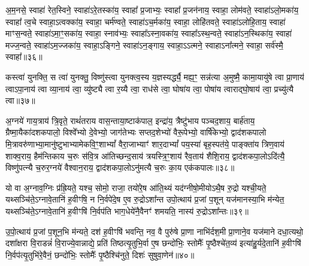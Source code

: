 अ॒म॒नसे॒ स्वाहा॑ रेत॒स्विने॒ स्वाहा॑\-ऽरे॒तस्का॑य॒ स्वाहा᳚ प्र॒जाभ्यः॒ स्वाहा᳚ प्र॒जन॑नाय॒ स्वाहा॒ लोम॑वते॒ स्वाहा॑\-ऽलो॒मका॑य॒ स्वाहा᳚ त्व॒चे स्वाहा॒\-ऽत्वक्का॑य॒ स्वाहा॒ चर्म॑ण्वते॒ स्वाहा॑\-ऽच॒र्मका॑य॒ स्वाहा॒ लोहि॑तवते॒ स्वाहा॑\-ऽलोहि॒ताय॒ स्वाहा॑ माꣳस॒न्वते॒ स्वाहा॑\-ऽमा॒ꣳ॒सका॑य॒ स्वाहा॒ स्नाव॑भ्यः॒ स्वाहा᳚\-ऽस्ना॒वका॑य॒ स्वाहा᳚\-ऽस्थ॒न्वते॒ स्वाहा॑\-ऽन॒स्थिका॑य॒ स्वाहा॑ मज्ज॒न्वते॒ स्वाहा॑\-ऽम॒ज्जका॑य॒ स्वाहा॒\-ऽङ्गिने॒ स्वाहा॑\-ऽन॒ङ्गाय॒ स्वाहा॒\-ऽ\-ऽत्मने॒ स्वाहा\-ऽना᳚त्मने॒ स्वाहा॒ सर्व॑स्मै॒ स्वाहा᳚॥३६॥

{\anuvakamend[{म॒न॒स्विने॒ स्वाहा\-ऽना᳚त्मने॒ स्वाहा॒ द्वे च॑॥12॥}]}

कस्त्वा॑ युनक्ति॒ स त्वा॑ युनक्तु॒ विष्णु॑स्त्वा युनक्त्व॒स्य य॒ज्ञस्यर्द्ध्यै॒ मह्य॒ꣳ॒ सन्न॑त्या अ॒मुष्मै॒ कामा॒यायु॑षे त्वा प्रा॒णाय॑ त्वा\-ऽपा॒नाय॑ त्वा व्या॒नाय॑ त्वा॒ व्यु॑ष्ट्यै त्वा र॒य्यै त्वा॒ राध॑से त्वा॒ घोषा॑य त्वा॒ पोषा॑य त्वाराद्घो॒षाय॑ त्वा॒ प्रच्यु॑त्यै त्वा॥३७॥

{\anuvakamend[{कस्त्वा॒\-ऽष्टात्रिꣳ॑शत्॥13॥}]}

अ॒ग्नये॑ गाय॒त्राय॑ त्रि॒वृते॒ राथं॑तराय वास॒न्ताया॒ष्टाक॑पाल॒ इन्द्रा॑य॒ त्रैष्टु॑भाय पञ्चद॒शाय॒ बार्\mbox{}ह॑ताय॒ ग्रैष्मा॒यैका॑दशकपालो॒ विश्वे᳚भ्यो दे॒वेभ्यो॒ जाग॑तेभ्यः सप्तद॒शेभ्यो॑ वैरू॒पेभ्यो॒ वार्\mbox{}षि॑केभ्यो॒ द्वाद॑शकपालो मि॒त्रावरु॑णाभ्या॒मानु॑ष्टुभाभ्यामेक\-वि॒ꣳ॒शा\-भ्यां᳚ वैरा॒जाभ्याꣳ॑ शार॒दा\-भ्यां᳚ पय॒स्या॑ बृह॒स्पत॑ये॒ पाङ्क्ता॑य त्रिण॒वाय॑ शाक्व॒राय॒ हैम॑न्तिकाय च॒रुः स॑वि॒त्र आ॑तिच्छन्द॒साय॑ त्रयस्त्रि॒ꣳ॒शाय॑ रैव॒ताय॑ शैशि॒राय॒ द्वाद॑शकपा॒लो\-ऽदि॑त्यै॒ विष्णु॑पत्न्यै च॒रुर॒ग्नये॑ वैश्वान॒राय॒ द्वाद॑शकपा॒लो\-ऽनु॑मत्यै च॒रुः का॒य एक॑कपालः॥३८॥

{\anuvakamend[{अ॒ग्नये\-ऽदि॑त्या॒ अनु॑मत्यै स॒प्तच॑त्वारिꣳशत्॥14॥}]}

यो वा अ॒ग्नाव॒ग्निः प्र॑ह्रि॒यते॒ यश्च॒ सोमो॒ राजा॒ तयो॑रे॒ष आ॑ति॒थ्यं यद॑ग्नीषो॒मीयो\-ऽथै॒ष रु॒द्रो यश्ची॒यते॒ यथ्सञ्चि॑ते॒\-ऽग्नावे॒तानि॑ ह॒वीꣳषि॒ न नि॒र्वपे॑दे॒ष ए॒व रु॒द्रो\-ऽशा᳚न्त उपो॒त्थाय॑ प्र॒जां प॒शून् यज॑मानस्या॒भि म॑न्येत॒ यथ्सञ्चि॑ते॒\-ऽग्नावे॒तानि॑ ह॒वीꣳषि॑ नि॒र्वप॑ति भाग॒धेये॑नै॒वैनꣳ॑ शमयति॒ नास्य॑ रु॒द्रो\-ऽशा᳚न्तः॥३९॥

उ॒पो॒त्थाय॑ प्र॒जां प॒शून॒भि म॑न्यते॒ दश॑ ह॒वीꣳषि॑ भवन्ति॒ नव॒ वै पुरु॑षे प्रा॒णा नाभि॑र्दश॒मी प्रा॒णाने॒व यज॑माने दधा॒त्यथो॒ दशा᳚क्षरा वि॒राडन्नं॑ वि॒राज्ये॒वान्नाद्ये॒ प्रति॑ तिष्ठत्यृ॒तुभि॒र्वा ए॒ष छन्दो॑भिः॒ स्तोमैः᳚ पृ॒ष्ठैश्चे॑त॒व्य॑ इत्या॑हु॒र्यदे॒तानि॑ ह॒वीꣳषि॑ नि॒र्वप॑त्यृ॒तुभि॑रे॒वैनं॒ छन्दो॑भिः॒ स्तोमैः᳚ पृ॒ष्ठैश्चि॑नुते॒ दिशः॑ सुषुवा॒णेन॑॥४०॥

